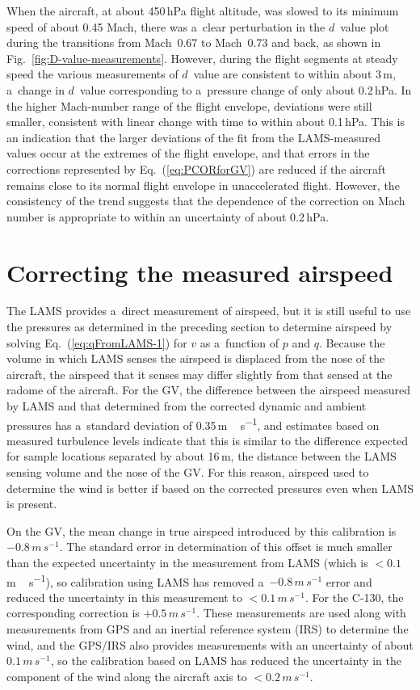 \documentclass[amtd, online, hvmath]{copernicus}
\begin{document}
When the aircraft, at about 450\,hPa flight altitude, was slowed to
its minimum speed of about 0.45 Mach, there was a~clear perturbation
in the $d$~value plot during the transitions from Mach~0.67 to Mach~0.73 and back, as shown in
Fig.~\ref{fig:D-value-measurements}.  However, during the flight
segments at steady speed the various measurements of $d$~value are
consistent to within about 3\,m, a~change in $d$~value corresponding
to a~pressure change of only about 0.2\,hPa. In the higher Mach-number
range of the flight envelope, deviations were still smaller,
consistent with linear change with time to within about 0.1\,hPa.
This is an indication that the larger deviations of the fit from the
LAMS-measured values occur at the extremes of the flight envelope, and
that errors in the corrections represented by Eq.~(\ref{eq:PCORforGV})
are reduced if the aircraft remains close to its normal flight
envelope in unaccelerated flight. However, the consistency of the
trend suggests that the dependence of the correction on Mach number is
appropriate to within an uncertainty of about 0.2\,hPa.

\section{Correcting the measured airspeed}

The LAMS provides a~direct measurement of airspeed, but it is still
useful to use the pressures as determined in the preceding section to
determine airspeed by solving Eq.~(\ref{eq:qFromLAMS-1}) for $v$ as
a~function of $p$ and $q$. Because the volume in which LAMS senses the
airspeed is displaced from the nose of the aircraft, the airspeed that
it senses may differ slightly from that sensed at the radome of the
aircraft. For the GV, the difference between the airspeed measured by
LAMS and that determined from the corrected dynamic and ambient
pressures has a~standard deviation of 0.35\,\unit{m\,s^{-1}}, and
estimates based on measured turbulence levels indicate that this is
similar to the difference expected for sample locations separated by
about 16\,\unit{m}, the distance between the LAMS sensing volume and
the nose of the GV. For this reason, airspeed used to determine the
wind is better if based on the corrected pressures even when LAMS is
present.

On the GV, the mean change in true airspeed introduced by this
calibration is $-0.8\,\unit{m\,s^{-1}}$. The standard error in
determination of this offset is much smaller than the expected
uncertainty in the measurement from LAMS (which is
$<0.1$\,\unit{m\,s^{-1}}), so calibration using LAMS has removed
a~$-0.8\,\unit{m\,s^{-1}}$ error and reduced the uncertainty in this
measurement to $<0.1\,\unit{m\,s^{-1}}$.  For the C-130, the
corresponding correction is $+0.5\,\unit{m\,s^{-1}}$.  These
measurements are used along with measurements from GPS and an inertial
reference system (IRS) to determine the wind, and the GPS/IRS also
provides measurements with an uncertainty of about
$0.1\,\unit{m\,s^{-1}}$, so the calibration based on LAMS has reduced
the uncertainty in the component of the wind along the aircraft axis
to $<0.2\,\unit{m\,s^{-1}}$.
\end{document}
